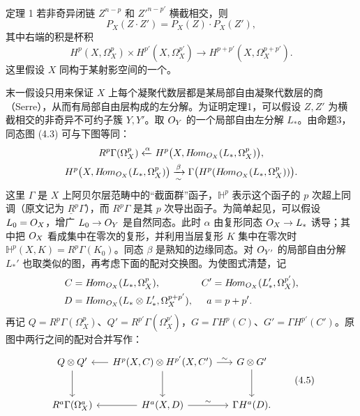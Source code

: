 \begin{statement}{定理 1}
若非奇异闭链 $Z^{n-p}$ 和 $Z'^{n-p'}$ 横截相交，则
\begin{equation}
P_X(Z\cdot Z')=P_X(Z)\cdot P_X(Z'),\tag{4.4}
\end{equation}
其中右端的积是杯积
\[
H^p(X,\Omega_X^p)\times H^{p'}(X,\Omega_X^{p'})
\longrightarrow H^{p+p'}(X,\Omega_X^{p+p'}).
\]
这里假设 $X$ 同构于某射影空间的一个。
\end{statement}
末一假设只用来保证 $X$ 上每个凝聚代数层都是某局部自由凝聚代数层的商（Serre），从而有局部自由层构成的左分解。为证明定理1，可以假设 $Z,Z'$ 为横截相交的非奇异不可约子簇 $Y,Y'$。取 $O_Y$ 的一个局部自由左分解 $L_*$。由命题3，同态图 (4.3) 可与下图等同：
\[
\begin{gathered}
R^p\Gamma(\Omega_X^p)
\xleftarrow{\alpha}H^p\bigl(X,H\!om_{O_X}(L_*,\Omega_X^p)\bigr),\\
H^p\bigl(X,H\!om_{O_X}(L_*,\Omega_X^p)\bigr)
\xrightarrow[\sim]{\beta}\Gamma\bigl(H^p(H\!om_{O_X}(L_*,\Omega_X^p))\bigr).
\end{gathered}
\]
这里 $\Gamma$ 是 $X$ 上阿贝尔层范畴中的“截面群”函子，$\mathbb H^p$ 表示这个函子的 $p$ 次超上同调（原文记为 $\underline R^p\Gamma$），而 $R^p\Gamma$ 是其 $p$ 次导出函子。为简单起见，可以假设 $L_0=O_X$，增广 $L_0\to O_Y$ 是自然同态。此时 $\alpha$ 由复形同态 $O_X\to L_*$ 诱导；其中把 $O_X$ 看成集中在零次的复形，并利用当层复形 $K$ 集中在零次时 $\mathbb H^p(X,K)=R^p\Gamma(K_0)$。同态 $\beta$ 是熟知的边缘同态。对 $O_{Y'}$ 的局部自由分解 $L_*'$ 也取类似的图，再考虑下面的配对交换图。为使图式清楚，记
\[
\begin{aligned}
C&=H\!om_{O_X}(L_*,\Omega_X^p),&
C'&=H\!om_{O_X}(L_*',\Omega_X^{p'}),\\
D&=H\!om_{O_X}(L_*\otimes L_*',\Omega_X^{p+p'}),&a&=p+p'.
\end{aligned}
\]
再记 $Q=R^p\Gamma(\Omega_X^p)$、$Q'=R^{p'}\Gamma(\Omega_X^{p'})$，$G=\Gamma H^p(C)$、$G'=\Gamma H^{p'}(C')$。原图中两行之间的配对合并写作：
\begin{equation}
\begin{tikzcd}[column sep=small,row sep=large]
Q\otimes Q'\arrow[d]
&\mathbb H^p(X,C)\otimes\mathbb H^{p'}(X,C')\arrow[l]\arrow[r,"\sim"]\arrow[d]
&G\otimes G'\arrow[d]\\
R^a\Gamma(\Omega_X^a)&\mathbb H^a(X,D)\arrow[l]\arrow[r,"\sim"]
&\Gamma H^a(D).
\end{tikzcd}\tag{4.5}
\end{equation}

